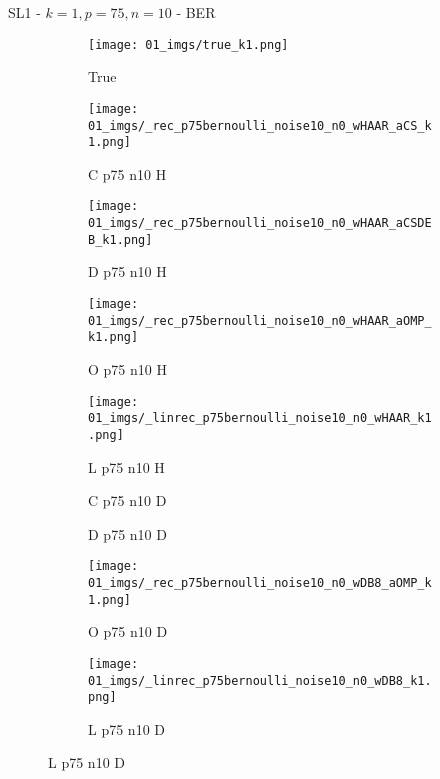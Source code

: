 \begin{frame}{SL1 - $k=1,p=75,n=10$ - BER}{}
\begin{figure}
\begin{subfigure}{0.1\textwidth}
\texttt{[image: 01\_imgs/true\_k1.png]}
\caption*{\Tiny True}
\end{subfigure}
\begin{subfigure}{0.1\textwidth}
\texttt{[image: 01\_imgs/\_rec\_p75bernoulli\_noise10\_n0\_wHAAR\_aCS\_k1.png]}
\caption*{\Tiny C p75 n10 H}
\end{subfigure}
\begin{subfigure}{0.1\textwidth}
\texttt{[image: 01\_imgs/\_rec\_p75bernoulli\_noise10\_n0\_wHAAR\_aCSDEB\_k1.png]}
\caption*{\Tiny D p75 n10 H}
\end{subfigure}
\begin{subfigure}{0.1\textwidth}
\texttt{[image: 01\_imgs/\_rec\_p75bernoulli\_noise10\_n0\_wHAAR\_aOMP\_k1.png]}
\caption*{\Tiny O p75 n10 H}
\end{subfigure}
\begin{subfigure}{0.1\textwidth}
\texttt{[image: 01\_imgs/\_linrec\_p75bernoulli\_noise10\_n0\_wHAAR\_k1.png]}
\caption*{\Tiny L p75 n10 H}
\end{subfigure}
\begin{subfigure}{0.1\textwidth}
\caption*{\Tiny C p75 n10 D}
\end{subfigure}
\begin{subfigure}{0.1\textwidth}
\caption*{\Tiny D p75 n10 D}
\end{subfigure}
\begin{subfigure}{0.1\textwidth}
\texttt{[image: 01\_imgs/\_rec\_p75bernoulli\_noise10\_n0\_wDB8\_aOMP\_k1.png]}
\caption*{\Tiny O p75 n10 D}
\end{subfigure}
\begin{subfigure}{0.1\textwidth}
\texttt{[image: 01\_imgs/\_linrec\_p75bernoulli\_noise10\_n0\_wDB8\_k1.png]}
\caption*{\Tiny L p75 n10 D}
\end{subfigure}
\end{figure}
\end{frame}


